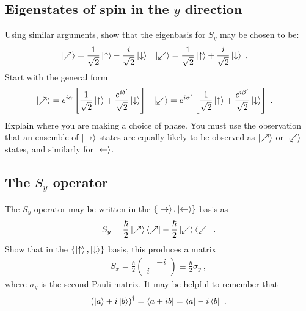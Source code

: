 \documentclass[12pt, oneside]{report}    %
\begin{document}
\subsection{Eigenstates of spin in the $y$ direction}
Using similar arguments, show that the eigenbasis for $S_y$ may be chosen to be:
\begin{align}
    \left|\nearrow\right\rangle &= 
    \frac{1}{\sqrt{2}}\left|\uparrow\right\rangle - \frac{i}{\sqrt{2}}\left|\downarrow\right\rangle
    &
    \left|\swarrow\right\rangle &= 
    \frac{1}{\sqrt{2}}\left|\uparrow\right\rangle + \frac{i}{\sqrt{2}}\left|\downarrow\right\rangle
    \ .
\end{align}
Start with the general form 
\begin{align}
    \left|\nearrow\right\rangle &= 
    e^{i\alpha}\left[\frac{1}{\sqrt{2}}\left|\uparrow\right\rangle + \frac{e^{i\delta'}}{\sqrt{2}}\left|\downarrow\right\rangle \right]
    &
    \left|\swarrow\right\rangle &= 
    e^{i\alpha'}\left[\frac{1}{\sqrt{2}}\left|\uparrow\right\rangle + \frac{e^{i\beta'}}{\sqrt{2}}\left|\downarrow\right\rangle \right]
    \ .
\end{align}
Explain where you are making a choice of phase. You must use the observation that an ensemble of $\left|\rightarrow\right\rangle$ states are equally likely to be observed as $\left|\nearrow\right\rangle$ or $\left|\swarrow\right\rangle$ states, and similarly for $\left|\leftarrow\right\rangle$.

\subsection{The $S_y$ operator}

The $S_y$ operator may be written in the $\{\left|\rightarrow\right\rangle, \left|\leftarrow\right\rangle\}$ basis as
\begin{align}
    S_y = 
    \frac{\hbar}{2}\left|\nearrow\right\rangle\left\langle\nearrow\right|
    -
    \frac{\hbar}{2}\left|\swarrow\right\rangle\left\langle\swarrow\right| \ .
\end{align}
Show that in the $\{\left|\uparrow\right\rangle,\left|\downarrow\right\rangle\}$ basis, this produces a matrix
\begin{align}
    S_x = 
    \frac{\hbar}{2}
    \begin{pmatrix}
         & -i\\ i &  
    \end{pmatrix}
    \equiv \frac{\hbar}{2}  \sigma_y \ ,
\end{align}
where $\sigma_y$ is the second Pauli matrix. It may be helpful to remember that
\begin{align}
    \left(\left|a\right\rangle + i\left|b\right\rangle\right)^\dag = \left\langle a+ib\right| = \left\langle a\right| - i \left\langle b\right| \ .
\end{align}
\end{document}
